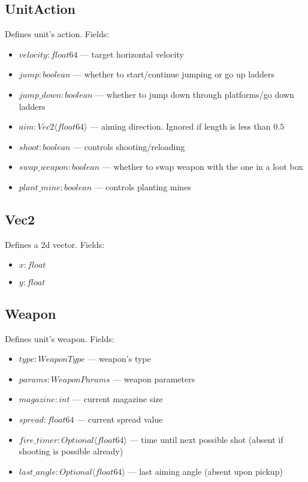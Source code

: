 \subsection{UnitAction}
Defines unit's action. Fields:
\begin{itemize}
    \item $velocity : float64$ --- target horizontal velocity
    \item $jump : boolean$ --- whether to start/continue jumping or go up ladders
    \item $jump\_down : boolean$ --- whether to jump down through platforms/go down ladders
    \item $aim : Vec2 \langle float64 \rangle$ --- aiming direction. Ignored if length is less than $0.5$
    \item $shoot : boolean$ --- controls shooting/reloading
    \item $swap\_weapon : boolean$ --- whether to swap weapon with the one in a loot box
    \item $plant\_mine : boolean$ --- controls planting mines
\end{itemize}

\subsection{Vec2}
Defines a 2d vector. Fields:
\begin{itemize}
    \item $x : float$
    \item $y : float$
\end{itemize}

\subsection{Weapon}
Defines unit's weapon. Fields:
\begin{itemize}
    \item $type : WeaponType$ --- weapon's type
    \item $params : WeaponParams$ --- weapon parameters
    \item $magazine : int$ --- current magazine size
    \item $spread : float64$ --- current spread value
    \item $fire\_timer : Optional \langle float64 \rangle$ --- time until next possible shot (absent if shooting is possible already)
    \item $last\_angle : Optional \langle float64 \rangle$ --- last aiming angle (absent upon pickup)
\end{itemize}

